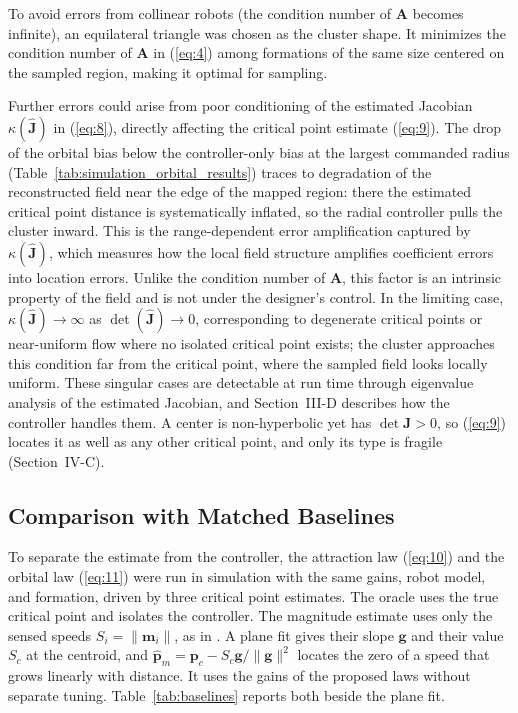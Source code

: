 \documentclass[lettersize,journal]{IEEEtran}
\begin{document}
To avoid errors from collinear robots (the condition number of $\mathbf{A}$ becomes infinite), an equilateral triangle was chosen as the cluster shape. It minimizes the condition number of $\mathbf{A}$ in (\ref{eq:4}) among formations of the same size centered on the sampled region, making it optimal for sampling.

Further errors could arise from poor conditioning of the estimated Jacobian $\kappa(\hat{\mathbf{J}})$ in (\ref{eq:8}), directly affecting the critical point estimate (\ref{eq:9}). The drop of the orbital bias below the controller-only bias at the largest commanded radius (Table~\ref{tab:simulation_orbital_results}) traces to degradation of the reconstructed field near the edge of the mapped region: there the estimated critical point distance is systematically inflated, so the radial controller pulls the cluster inward. This is the range-dependent error amplification captured by $\kappa(\hat{\mathbf{J}})$, which measures how the local field structure amplifies coefficient errors into location errors. Unlike the condition number of $\mathbf{A}$, this factor is an intrinsic property of the field and is not under the designer's control. In the limiting case, $\kappa(\hat{\mathbf{J}}) \to \infty$ as $\det(\hat{\mathbf{J}}) \to 0$, corresponding to degenerate critical points or near-uniform flow where no isolated critical point exists; the cluster approaches this condition far from the critical point, where the sampled field looks locally uniform. These singular cases are detectable at run time through eigenvalue analysis of the estimated Jacobian, and Section~III-D describes how the controller handles them. A center is non-hyperbolic yet has $\det\mathbf{J} > 0$, so (\ref{eq:9}) locates it as well as any other critical point, and only its type is fragile (Section~IV-C).
\subsection{Comparison with Matched Baselines}

To separate the estimate from the controller, the attraction law (\ref{eq:10}) and the orbital law (\ref{eq:11}) were run in simulation with the same gains, robot model, and formation, driven by three critical point estimates. The oracle uses the true critical point and isolates the controller. The magnitude estimate uses only the sensed speeds $S_i = \|\mathbf{m}_i\|$, as in \cite{48}. A plane fit gives their slope $\mathbf{g}$ and their value $S_c$ at the centroid, and $\hat{\mathbf{p}}_m = \mathbf{p}_c - S_c\mathbf{g}/\|\mathbf{g}\|^2$ locates the zero of a speed that grows linearly with distance. It uses the gains of the proposed laws without separate tuning. Table~\ref{tab:baselines} reports both beside the plane fit.
\end{document}
